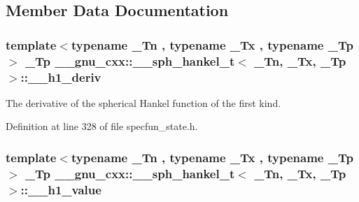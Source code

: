 \subsection{Member Data Documentation}
\subsubsection[{\texorpdfstring{\+\_\+\+\_\+h1\+\_\+deriv}{__h1_deriv}}]{\setlength{\rightskip}{0pt plus 5cm}template$<$typename \+\_\+\+Tn , typename \+\_\+\+Tx , typename \+\_\+\+Tp $>$ \+\_\+\+Tp {\bf \+\_\+\+\_\+gnu\+\_\+cxx\+::\+\_\+\+\_\+sph\+\_\+hankel\+\_\+t}$<$ \+\_\+\+Tn, \+\_\+\+Tx, \+\_\+\+Tp $>$\+::\+\_\+\+\_\+h1\+\_\+deriv}\hypertarget{struct____gnu__cxx_1_1____sph__hankel__t_a7b734a1eef61be0bee57ffafa4d9d17d}{}\label{struct____gnu__cxx_1_1____sph__hankel__t_a7b734a1eef61be0bee57ffafa4d9d17d}


The derivative of the spherical Hankel function of the first kind. 



Definition at line 328 of file specfun\+\_\+state.\+h.

\subsubsection[{\texorpdfstring{\+\_\+\+\_\+h1\+\_\+value}{__h1_value}}]{\setlength{\rightskip}{0pt plus 5cm}template$<$typename \+\_\+\+Tn , typename \+\_\+\+Tx , typename \+\_\+\+Tp $>$ \+\_\+\+Tp {\bf \+\_\+\+\_\+gnu\+\_\+cxx\+::\+\_\+\+\_\+sph\+\_\+hankel\+\_\+t}$<$ \+\_\+\+Tn, \+\_\+\+Tx, \+\_\+\+Tp $>$\+::\+\_\+\+\_\+h1\+\_\+value}\hypertarget{struct____gnu__cxx_1_1____sph__hankel__t_aedd78dab2380f51554d4e4fabe4b88e6}{}\label{struct____gnu__cxx_1_1____sph__hankel__t_aedd78dab2380f51554d4e4fabe4b88e6}


